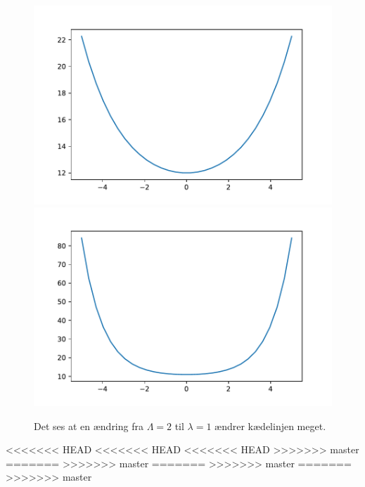 \begin{figure}[h!]
\includegraphics[scale=0.5]{code/fig3}
\includegraphics[scale=0.5]{code/fig4}
\caption{Det ses at en ændring fra $\Lambda=2$ til $\lambda=1$ ændrer kædelinjen meget.}
\end{figure}

<<<<<<< HEAD
<<<<<<< HEAD
<<<<<<< HEAD
>>>>>>> master
=======
>>>>>>> master
=======
>>>>>>> master
=======
>>>>>>> master

